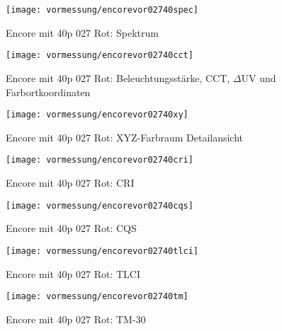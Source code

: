 \documentclass[pagesize,paper=A4,fontsize=12pt,utf8,numbers=noenddot,bibliography=totoc,listof=totoc,DIV=11,BCOR=1mm]{scrreprt}
\begin{document}
\begin{figure}[htp]     %
\centering
\texttt{[image: vormessung/encorevor02740spec]} 
\caption {Encore mit 40p 027 Rot: Spektrum} 
\end{figure}

\begin{figure}[htp]     %
\centering
\texttt{[image: vormessung/encorevor02740cct]} 
\caption {Encore mit 40p 027 Rot: Beleuchtungsstärke, CCT, $\Delta$UV und Farbortkoordinaten} 
\end{figure}

\begin{figure}[htp]     %
\centering
\texttt{[image: vormessung/encorevor02740xy]} 
\caption {Encore mit 40p 027 Rot: XYZ-Farbraum Detailansicht} 
\end{figure}

\begin{figure}[htp]     %
\centering
\texttt{[image: vormessung/encorevor02740cri]} 
\caption {Encore mit 40p 027 Rot: CRI} 
\end{figure}

\begin{figure}[htp]     %
\centering
\texttt{[image: vormessung/encorevor02740cqs]} 
\caption {Encore mit 40p 027 Rot: CQS} 
\end{figure}

\begin{figure}[htp]     %
\centering
\texttt{[image: vormessung/encorevor02740tlci]} 
\caption {Encore mit 40p 027 Rot: TLCI} 
\end{figure}

\begin{figure}[htp]     %
\centering
\texttt{[image: vormessung/encorevor02740tm]} 
\caption {Encore mit 40p 027 Rot: TM-30} 
\end{figure}
\end{document}
